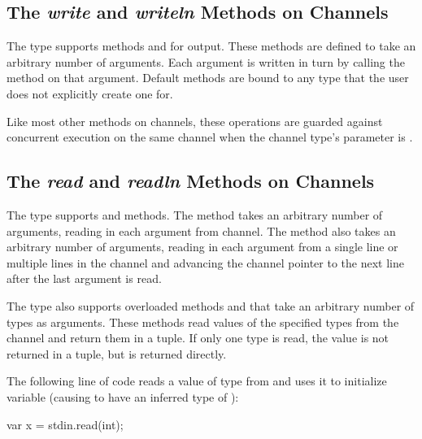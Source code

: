 \label{User_Defined_writeThis_Methods}

\subsection{The {\em write} and {\em writeln} Methods on Channels}
\label{IO_channel_write}

The  type supports methods  and 
for output.  These methods are defined to take an arbitrary number of
arguments.  Each argument is written in turn by calling
the  method on that argument.
Default  methods are bound to any type that the user
does not explicitly create one for.

Like most other methods on channels,
these operations are guarded against concurrent execution on the same channel
when the channel type's  parameter is .


\subsection{The {\em read} and {\em readln} Methods on Channels}
\label{IO_channel_read}

The  type supports  and  methods.
The  method takes an arbitrary number of arguments, reading
in each argument from channel.  The  method also
takes an arbitrary number of arguments, reading in each argument
from a single line or multiple lines in the channel and 
advancing the channel pointer to the next line after the last argument 
is read.

The  type also supports overloaded methods 
and  that take an arbitrary number of types as arguments.
These methods read values of the specified types from the channel and
return them in a tuple.  If only one type is read, the value is not
returned in a tuple, but is returned directly.

\begin{example}
The following line of code reads a value of type  from
 and uses it to initialize variable  (causing
 to have an inferred type of ):
\begin{chapel}
var x = stdin.read(int);
\end{chapel}
\end{example}


